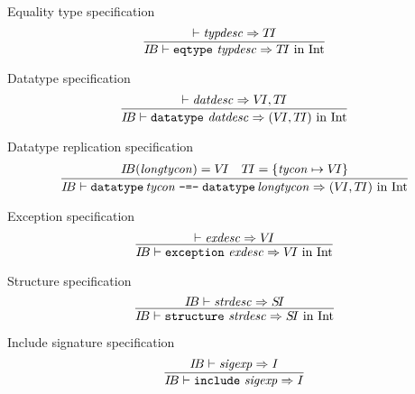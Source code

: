 \begin{inference-rule}{Equality type specification}
\begin{equation}\label{rule:dynamic-modules:eqtype-specification}
\vcenter{\infer{\IB\ts\eqtypespec\ra\TI\ \In\ \Int}
  {\ts\typdesc\ra\TI}}
\end{equation}
\end{inference-rule}

\begin{inference-rule}{Datatype specification}
\begin{equation}\label{rule:dynamic-modules:datatype-specification}
\vcenter{\infer{\IB\ts\datatypespec\ra(\VI,\TI)\ \In\ \Int}
  {\ts\datdesc\ra\VI,\TI}}
\end{equation}
\end{inference-rule}

\begin{inference-rule}{Datatype replication specification}
\begin{equation}\label{rule:dynamic-modules:datatype-replication-specification}
\vcenter{\infer{\IB\ts\datatypereplspec\ra(\VI,\TI)\ \In\ \Int}
  {\IB(\longtycon) = \VI
    & \TI = \{\tycon\mapsto\VI\}}}
\end{equation}
\end{inference-rule}

\begin{inference-rule}{Exception specification}
\begin{equation}\label{rule:dynamic-modules:exception-specification}
\vcenter{\infer{\IB\ts\exceptionspec\ra \VI\ \In\ \Int}
  {\ts\exndesc\ra\VI}}
\end{equation}
\end{inference-rule}

\begin{inference-rule}{Structure specification}
\begin{equation}\label{rule:dynamic-modules:structure-specification}
\vcenter{\infer{\IB\ts\structurespec\ra\SI\ \In\ \Int}
  {\IB\ts\strdesc\ra\SI}}
\end{equation}
\end{inference-rule}

\begin{inference-rule}{Include signature specification}
\begin{equation}\label{rule:dynamic-modules:include-signature-spec}
\vcenter{\infer{\IB\ts\singleinclspec\ra\I}
  {\IB\ts\sigexp\ra\I}}
\end{equation}
\end{inference-rule}

